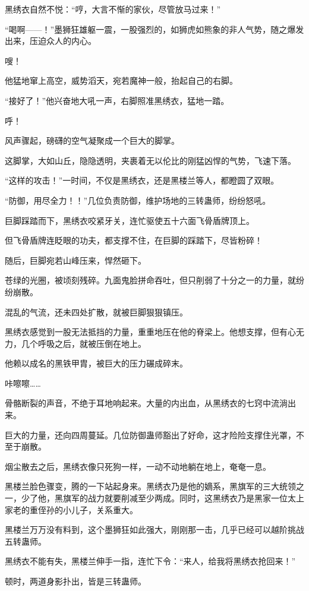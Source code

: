 \begin{this_body}
黑绣衣自然不悦：“哼，大言不惭的家伙，尽管放马过来！”

“喝啊——！”墨狮狂雄躯一震，一股强烈的，如狮虎如熊象的非人气势，随之爆发出来，压迫众人的内心。

嗖！

他猛地窜上高空，威势滔天，宛若魔神一般，抬起自己的右脚。

“接好了！”他兴奋地大吼一声，右脚照准黑绣衣，猛地一踏。

呼！

风声骤起，磅礴的空气凝聚成一个巨大的脚掌。

这脚掌，大如山丘，隐隐透明，夹裹着无以伦比的刚猛凶悍的气势，飞速下落。

“这样的攻击！”一时间，不仅是黑绣衣，还是黑楼兰等人，都瞪圆了双眼。

“防御，用尽全力！！”几位负责防御，维护场地的三转蛊师，纷纷怒吼。

巨脚踩踏而下，黑绣衣咬紧牙关，连忙驱使五十六面飞骨盾牌顶上。

但飞骨盾牌连眨眼的功夫，都支撑不住，在巨脚的踩踏下，尽皆粉碎！

随后，巨脚宛若山峰压来，悍然砸下。

苍绿的光圈，被顷刻残碎。九面鬼脸拼命吞吐，但只削弱了十分之一的力量，就纷纷崩散。

混乱的气流，还未四处扩散，就被巨脚狠狠镇压。

黑绣衣感觉到一股无法抵挡的力量，重重地压在他的脊梁上。他想支撑，但有心无力，几个呼吸之后，就被压倒在地上。

他赖以成名的黑铁甲胄，被巨大的压力碾成碎末。

咔嚓嚓……

骨骼断裂的声音，不绝于耳地响起来。大量的内出血，从黑绣衣的七窍中流淌出来。

巨大的力量，还向四周蔓延。几位防御蛊师豁出了好命，这才险险支撑住光罩，不至于崩散。

烟尘散去之后，黑绣衣像只死狗一样，一动不动地躺在地上，奄奄一息。

黑楼兰脸色骤变，腾的一下站起身来。黑绣衣乃是他的嫡系，黑旗军的三大统领之一，少了他，黑旗军的战力就要削减至少两成。同时，这黑绣衣乃是黑家一位太上家老的重侄孙的小儿子，关系重大。

黑楼兰万万没有料到，这个墨狮狂如此强大，刚刚那一击，几乎已经可以越阶挑战五转蛊师。

黑绣衣不能有失，黑楼兰伸手一指，连忙下令：“来人，给我将黑绣衣抢回来！”

顿时，两道身影扑出，皆是三转蛊师。


\end{this_body}
